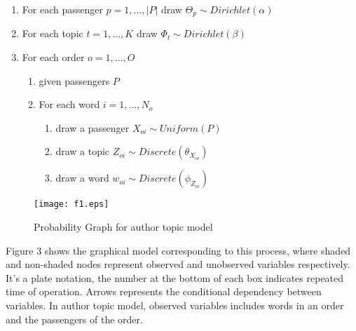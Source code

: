 \documentclass{sig-alternate-05-2015}
\begin{document}
\begin{enumerate}
\item For each passenger $p=1,\dots,|P|$ draw $\Theta_p \sim Dirichlet(\alpha)$
\item For each topic $t=1,\dots,K$ draw $\Phi_t \sim Dirichlet(\beta)$
\item For each order $o=1,\dots,O$
       \begin{enumerate}[fullwidth,itemindent=1em,label=(\alph*)]
       \item given passengers $P$
       \item For each word $i=1,\dots, N_o$
              \begin{enumerate}[fullwidth,itemindent=2em,label=(\roman*)]
              \item draw a passenger $X_{oi} \sim Uniform(P)$
              \item draw a topic $Z_{oi} \sim Discrete(\theta_{X_{oi}})$
              \item draw a word $w_{oi} \sim Discrete(\phi_{Z_{oi}})$
              \end{enumerate}
       \end{enumerate}
\end{enumerate}
\begin{figure}[!hbt]
\centering
\texttt{[image: f1.eps]}
\caption{Probability Graph for author topic model}
\label{fig:Prob}
\end{figure}\par
Figure 3 shows the graphical model corresponding to this process, where shaded and non-shaded nodes represent observed and unobserved variables respectively. It's a plate notation, the number at the bottom of each box indicates repeated time of operation. Arrows represents the conditional dependency between variables. In author topic model, observed variables includes words in an order and the passengers of the order.
\end{document}
